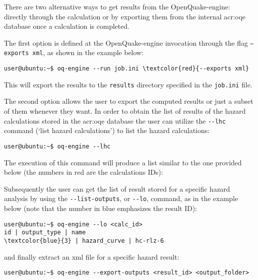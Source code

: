 There are two alternative ways to get results from the OpenQuake-engine:
directly through the calculation or by exporting them from the internal
\gls{acr:oqe} database once a calculation is completed.

The first option is defined at the OpenQuake-engine invocation through the
flag \texttt{--exports xml}, as shown in the example below:

\begin{Verbatim}[frame=single, commandchars=\\\{\}, fontsize=\small]
user@ubuntu:~$ oq-engine --run job.ini \textcolor{red}{--exports xml}
\end{Verbatim}
\noindent This will export the results to the \verb=results= directory specified in the \verb=job.ini= file. 

The second option allows the user to export the computed results or just a
subset of them whenever they want. In order to obtain the list of results of
the hazard calculations stored in the \gls{acr:oqe} database the user can
utilize the \texttt{-{}-lhc} command (`list hazard calculations') to list the hazard calculations:

\begin{Verbatim}[frame=single, commandchars=\\\{\}, fontsize=\small]
user@ubuntu:~$ oq-engine --lhc
\end{Verbatim}

The execution of this command will produce a list similar to the one provided
below (the numbers in red are the calculations IDs):



Subsequently the user can get the list of result stored for a specific hazard
analysis by using the \texttt{-{}-list-outputs}, or \texttt{-{}-lo}, command, as in the example below (note that the number in blue emphasizes the
result ID):

\begin{Verbatim}[frame=single, commandchars=\\\{\}, fontsize=\small]
user@ubuntu:~$ oq-engine --lo <calc_id>
id | output_type | name
\textcolor{blue}{3} | hazard_curve | hc-rlz-6
\end{Verbatim}

and finally extract an xml file for a specific hazard result:

\begin{Verbatim}[frame=single, commandchars=\\\{\}, fontsize=\small]
user@ubuntu:~$ oq-engine --export-outputs <result_id> <output_folder>
\end{Verbatim}


